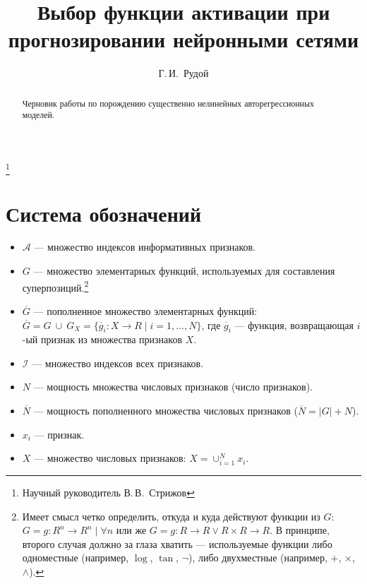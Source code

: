 \documentclass[12pt,a4paper]{amsart}
\begin{document}
\pagestyle{plain}

\title{Выбор функции активации при прогнозировании нейронными сетями}
\author{Г.\,И.~Рудой}
\address{Московский физико-технический институт, ФУПМ, каф. <<Интеллектуальные системы>>}
\thanks{Научный руководитель В.\,В.~Стрижов}

\begin{abstract}
  Черновик работы по порождению существенно нелинейных авторегрессионных моделей.
\end{abstract}

\maketitle

\section{Система обозначений}

\begin{itemize}
  \item $ \mathcal{A} $ --- множество индексов информативных признаков.
  \item $ G $ --- множество элементарных функций, используемых для составления суперпозиций.\footnote{Имеет смысл четко определить, откуда и куда действуют функции из $G$: $G = { g : R^n \to R^n \mid \forall n }$ или же $ G = { g : R \to R \lor R \times R \to R} $. В принципе, второго случая должно за глаза хватить --- используемые функции либо одноместные (например, $\log$, $\tan$, $\neg$), либо двухместные (например, $+$, $\times$, $\land$).}
  \item $ \overline{G} $ --- пополненное множество элементарных функций: $ \overline{G} = G\ \cup\ G_X = \{ \overline{g}_i : X \to R \mid i = 1, \dots, N\} $, где $\overline{g}_i$ --- функция, возвращающая $i$-ый признак из множества признаков $X$.
  \item $ \mathcal{I} $ --- множество индексов всех признаков.
  \item $ N $ --- мощность множества числовых признаков (число признаков).
  \item $ \overline{N} $ --- мощность пополненного множества числовых признаков ($\overline{N} = |G| + N$).
  \item $ x_i $ --- признак.
  \item $ X $ --- множество числовых признаков: $ X = \cup_{i = 1}^N {x_i}$.
\end{itemize}
\end{document}
